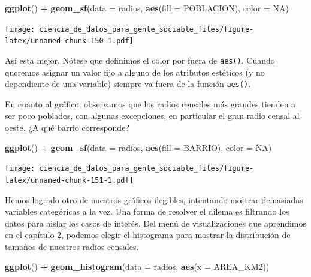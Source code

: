 \documentclass[spanish,]{book}
\newenvironment{Shaded}{\begin{snugshade}}{\end{snugshade}}
\newcommand{\DataTypeTok}[1]{\textcolor[rgb]{0.13,0.29,0.53}{#1}}
\newcommand{\KeywordTok}[1]{\textcolor[rgb]{0.13,0.29,0.53}{\textbf{#1}}}
\newcommand{\NormalTok}[1]{#1}
\newcommand{\OperatorTok}[1]{\textcolor[rgb]{0.81,0.36,0.00}{\textbf{#1}}}
\newcommand{\OtherTok}[1]{\textcolor[rgb]{0.56,0.35,0.01}{#1}}
\newcommand{\StringTok}[1]{\textcolor[rgb]{0.31,0.60,0.02}{#1}}
\begin{document}
\begin{Shaded}
\begin{Highlighting}[]
\KeywordTok{ggplot}\NormalTok{() }\OperatorTok{+}\StringTok{ }\KeywordTok{geom_sf}\NormalTok{(}\DataTypeTok{data =}\NormalTok{ radios, }\KeywordTok{aes}\NormalTok{(}\DataTypeTok{fill =}\NormalTok{ POBLACION), }\DataTypeTok{color =} \OtherTok{NA}\NormalTok{)}
\end{Highlighting}
\end{Shaded}

\texttt{[image: ciencia\_de\_datos\_para\_gente\_sociable\_files/figure-latex/unnamed-chunk-150-1.pdf]}

Así esta mejor. Nótese que definimos el color por fuera de \texttt{aes()}. Cuando queremos asignar un valor fijo a alguno de los atributos estéticos (y no dependiente de una variable) siempre va fuera de la función \texttt{aes()}.

En cuanto al gráfico, observamos que los radios censales más grandes tienden a ser poco poblados, con algunas excepciones, en particular el gran radio censal al oeste. ¿A qué barrio corresponde?

\begin{Shaded}
\begin{Highlighting}[]
\KeywordTok{ggplot}\NormalTok{() }\OperatorTok{+}\StringTok{ }\KeywordTok{geom_sf}\NormalTok{(}\DataTypeTok{data =}\NormalTok{ radios, }\KeywordTok{aes}\NormalTok{(}\DataTypeTok{fill =}\NormalTok{ BARRIO), }\DataTypeTok{color =} \OtherTok{NA}\NormalTok{)}
\end{Highlighting}
\end{Shaded}

\texttt{[image: ciencia\_de\_datos\_para\_gente\_sociable\_files/figure-latex/unnamed-chunk-151-1.pdf]}

Hemos logrado otro de nuestros gráficos ilegibles, intentando mostrar demasiadas variables categóricas a la vez. Una forma de resolver el dilema es filtrando los datos para aislar los casos de interés. Del menú de visualizaciones que aprendimos en el capítulo 2, podemos elegir el histograma para mostrar la distribución de tamaños de nuestros radios censales.

\begin{Shaded}
\begin{Highlighting}[]
\KeywordTok{ggplot}\NormalTok{() }\OperatorTok{+}\StringTok{ }\KeywordTok{geom_histogram}\NormalTok{(}\DataTypeTok{data =}\NormalTok{ radios, }\KeywordTok{aes}\NormalTok{(}\DataTypeTok{x =}\NormalTok{ AREA_KM2))}
\end{Highlighting}
\end{Shaded}
\end{document}
